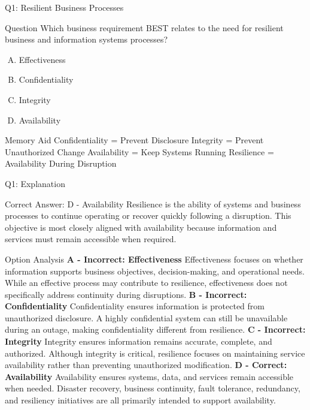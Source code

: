 \documentclass{beamer}
\begin{document}
	
	\begin{frame}{Q1: Resilient Business Processes} \begin{block}{Question} Which business requirement BEST relates to the need for resilient business and information systems processes? \end{block} \begin{enumerate}[(A)] \item Effectiveness \item Confidentiality \item Integrity \item Availability \end{enumerate} \begin{block}{Memory Aid} Confidentiality = Prevent Disclosure Integrity = Prevent Unauthorized Change Availability = Keep Systems Running Resilience = Availability During Disruption \end{block} \end{frame} \begin{frame}{Q1: Explanation} \footnotesize \begin{block}{Correct Answer: D - Availability} Resilience is the ability of systems and business processes to continue operating or recover quickly following a disruption. This objective is most closely aligned with availability because information and services must remain accessible when required. \end{block} \begin{block}{Option Analysis} \textbf{A - Incorrect: Effectiveness} Effectiveness focuses on whether information supports business objectives, decision-making, and operational needs. While an effective process may contribute to resilience, effectiveness does not specifically address continuity during disruptions. \vspace{0.15cm} \textbf{B - Incorrect: Confidentiality} Confidentiality ensures information is protected from unauthorized disclosure. A highly confidential system can still be unavailable during an outage, making confidentiality different from resilience. \vspace{0.15cm} \textbf{C - Incorrect: Integrity} Integrity ensures information remains accurate, complete, and authorized. Although integrity is critical, resilience focuses on maintaining service availability rather than preventing unauthorized modification. \vspace{0.15cm} \textbf{D - Correct: Availability} Availability ensures systems, data, and services remain accessible when needed. Disaster recovery, business continuity, fault tolerance, redundancy, and resiliency initiatives are all primarily intended to support availability. \end{block}  \end{frame}
	
\end{document}
